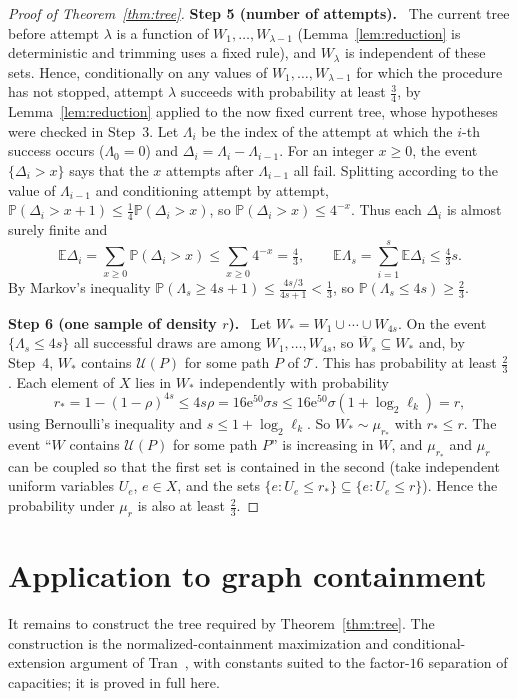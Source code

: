 \documentclass[11pt]{article}
\numberwithin{equation}{section}
\newcommand{\PP}{\mathbb P}
\newcommand{\EE}{\mathbb E}
\newcommand{\TT}{\mathcal T}
\newcommand{\UU}{\mathcal U}
\newcommand{\ee}{\mathrm e}
\newcommand{\step}[2]{\par\medskip\noindent\textbf{Step #1 (#2).}\ }
\begin{document}
\begin{proof}[Proof of Theorem~\ref{thm:tree}]
\step{5}{number of attempts}
The current tree before attempt $\lambda$ is a function of
$W_1,\ldots,W_{\lambda-1}$ (Lemma~\ref{lem:reduction} is deterministic
and trimming uses a fixed rule), and $W_\lambda$ is independent of
these sets. Hence, conditionally on any values of
$W_1,\ldots,W_{\lambda-1}$ for which the procedure has not stopped,
attempt $\lambda$ succeeds with probability at least $\frac34$, by
Lemma~\ref{lem:reduction} applied to the now fixed current tree, whose
hypotheses were checked in Step~3. Let $\Lambda_i$ be the index of the
attempt at which the $i$-th success occurs ($\Lambda_0=0$) and
$\Delta_i=\Lambda_i-\Lambda_{i-1}$. For an integer $x\ge0$, the event
$\{\Delta_i>x\}$ says that the $x$ attempts after $\Lambda_{i-1}$ all
fail. Splitting according to the value of $\Lambda_{i-1}$ and
conditioning attempt by attempt,
$\PP(\Delta_i>x+1)\le\frac14\PP(\Delta_i>x)$, so
$\PP(\Delta_i>x)\le4^{-x}$. Thus each $\Delta_i$ is almost surely
finite and
\[
 \EE\Delta_i=\sum_{x\ge0}\PP(\Delta_i>x)\le\sum_{x\ge0}4^{-x}=\tfrac43,
 \qquad
 \EE\Lambda_s=\sum_{i=1}^s\EE\Delta_i\le\tfrac43s .
\]
By Markov's inequality
$\PP(\Lambda_s\ge4s+1)\le\frac{4s/3}{4s+1}<\frac13$, so
$\PP(\Lambda_s\le4s)\ge\frac23$.

\step{6}{one sample of density $r$}
Let $W_*=W_1\cup\cdots\cup W_{4s}$. On the event $\{\Lambda_s\le4s\}$
all successful draws are among $W_1,\ldots,W_{4s}$, so
$\overline W_s\subseteq W_*$ and, by Step~4, $W_*$ contains $\UU(P)$
for some path $P$ of $\TT$. This has probability at least $\frac23$.
Each element of $X$ lies in $W_*$ independently with probability
\[
 r_*=1-(1-\rho)^{4s}
 \le4s\rho
 =16\ee^{50}\sigma s
 \le16\ee^{50}\sigma(1+\log_2\ell_k)=r,
\]
using Bernoulli's inequality and
$s\le1+\log_2\ell_k$. So $W_*\sim\mu_{r_*}$ with $r_*\le r$. The event
``$W$ contains $\UU(P)$ for some path $P$'' is increasing in $W$, and
$\mu_{r_*}$ and $\mu_r$ can be coupled so that the first set is
contained in the second (take independent uniform variables $U_e$,
$e\in X$, and the sets $\{e:U_e\le r_*\}\subseteq\{e:U_e\le r\}$). Hence
the probability under $\mu_r$ is also at least $\frac23$.
\end{proof}

\section{Application to graph containment}\label{sec:graphs}

It remains to construct the tree required by Theorem~\ref{thm:tree}.
The construction is the normalized-containment maximization and
conditional-extension argument of
Tran~\cite[Section~3, Lemma~3.1]{Tran26}, with constants suited to the
factor-$16$ separation of capacities; it is proved in full here.
\end{document}
